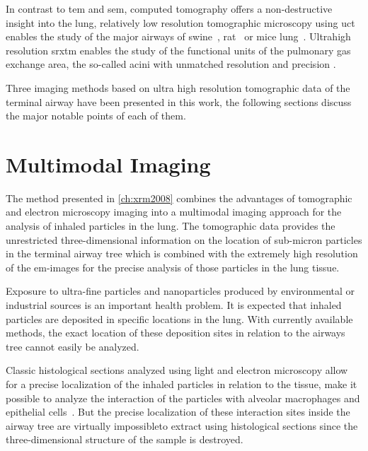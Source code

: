 In contrast to \ac{tem} and \ac{sem}, computed tomography offers a non-destructive insight into the lung, relatively low resolution tomographic microscopy using \ac{uct} enables the study of the major airways of swine~\cite{Litzlbauer2006}, rat~\cite{Langheinrich2004a,Sharif2010} or mice lung~\cite{Langheinrich2004,Ritman2005}. Ultrahigh resolution \ac{srxtm} enables the study of the functional units of the pulmonary gas exchange area, the so-called acini with unmatched resolution and precision \cite{Tsuda2008}.

Three imaging methods based on ultra high resolution tomographic data of the terminal airway have been presented in this work, the following sections discuss the major notable points of each of them.

\section{Multimodal Imaging}\label{sec:multimodal imaging}
The method presented in \autoref{ch:xrm2008} combines the advantages of tomographic and electron microscopy imaging into a multimodal imaging approach for the analysis of inhaled particles in the lung. The tomographic data provides the unrestricted three-dimensional information on the location of sub-micron particles in the terminal airway tree which is combined with the extremely high resolution of the \ac{em}-images for the precise analysis of those particles in the lung tissue.

Exposure to ultra-fine particles and nanoparticles produced by environmental or industrial sources is an important health problem. It is expected that inhaled particles are deposited in specific locations in the lung. With currently available methods, the exact location of these deposition sites in relation to the airways tree cannot easily be analyzed. 

Classic  histological sections analyzed using light and electron microscopy allow for a precise localization of the inhaled particles in relation to the tissue, \ie make it possible to analyze the interaction of the particles with alveolar macrophages and epithelial cells~\cite{Muhlfeld2008}. But the precise localization of these interaction sites inside the airway tree are virtually impossibleto extract using histological sections since the three-dimensional structure of the sample is destroyed.


